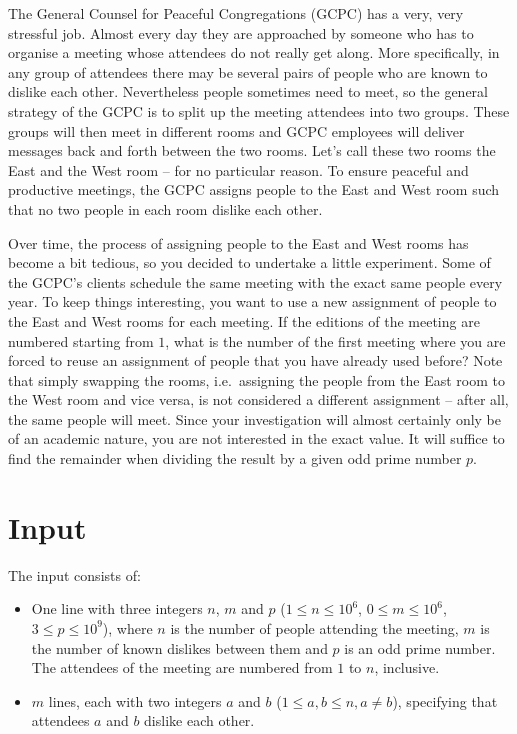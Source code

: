 
The General Counsel for Peaceful Congregations (GCPC) has a very, very stressful job.
Almost every day they are approached by someone who has to organise a meeting whose attendees do not really get along.
More specifically, in any group of attendees there may be several pairs of people who are known to dislike each other.
Nevertheless people sometimes need to meet,
so the general strategy of the GCPC is to split up the meeting attendees into two groups.
These groups will then meet in different rooms and
GCPC employees will deliver messages back and forth between the two rooms.
Let's call these two rooms the East and the West room -- for no particular reason.
To ensure peaceful and productive meetings, the GCPC assigns people to the East and West room such that no two people in each room dislike each other.


Over time, the process of assigning people to the East and West rooms has become a bit tedious,
so you decided to undertake a little experiment.
Some of the GCPC's clients schedule the same meeting with the exact same people every year.
To keep things interesting, you want to use a new assignment of people to the East and West rooms for each meeting.
If the editions of the meeting are numbered starting from $1$, what is the number of the first meeting where you are forced to reuse an assignment of people that you have already used before?
Note that simply swapping the rooms, i.e.\ assigning the people from the East room to the West room and vice versa, is not considered a different assignment -- after all, the same people will meet.
Since your investigation will almost certainly only be of an academic nature, you are not interested in the exact value.
It will suffice to find the remainder when dividing the result by a given odd prime number $p$.


\section*{Input}
The input consists of:
\begin{itemize}
  \item One line with three integers $n$, $m$ and $p$ ($1 \le n \le 10^6$, $0 \le m \le 10^6$, $3 \le p \le 10^9$), where $n$ is the number of people attending the meeting, $m$ is the number of known dislikes between them and $p$ is an odd prime number.
    The attendees of the meeting are numbered from $1$ to $n$, inclusive.
  \item $m$ lines, each with two integers $a$ and $b$ ($1 \le a,b \le n, a \neq b$), specifying that attendees $a$ and $b$ dislike each other.
\end{itemize}

